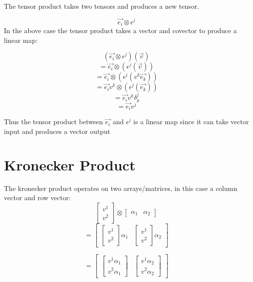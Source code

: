 \documentclass{report}
\begin{document}
The tensor product takes two tensors and produces a new tensor.

$$ \vec{e_i} \otimes \epsilon^j $$ 
In the above case the tensor product takes a vector and covector to produce a linear map:

\begin{myproof}
$$\left(  \vec{e_i} \otimes \epsilon^j  \right) \left( \vec{v} \right)$$ 
$$=  \vec{e_i} \otimes \left( \epsilon^j  \left( \vec{v} \right) \right)$$ 
$$=  \vec{e_i} \otimes \left( \epsilon^j  \left( v^k \vec{e_k} \right) \right)$$ 
$$=  \vec{e_i} v^k \otimes \left(  \epsilon^j   \left(  \vec{e_k} \right) \right)$$ 
$$=  \vec{e_i} v^k \delta_k^j $$ 
$$=  \vec{e_i} v^j $$ 

Thus the tensor product between $\vec{e_i}$ and $\epsilon^j$ is a linear map since it can take vector input and produces a vector output
	
\end{myproof}

\section{Kronecker Product}
The kronecker product operates on two arrays/matrices, in this case a column vector and row vector:
$$ \begin{bmatrix} v^1 \\ v^2 \end{bmatrix} \otimes \begin{bmatrix} \alpha_1 & \alpha_2 \end{bmatrix}  $$ 
$$ = \begin{bmatrix} \begin{bmatrix} v^1  \\ v^2 \end{bmatrix}\alpha_1 & \begin{bmatrix} v^1  \\ v^2 \end{bmatrix} \alpha_2  \end{bmatrix}  $$ 

$$ = \begin{bmatrix} \begin{bmatrix} v^1 \alpha_1 \\ v^2 \alpha_1 \end{bmatrix} & \begin{bmatrix} v^1 \alpha_2 \\ v^2 \alpha_2 \end{bmatrix}   \end{bmatrix}  $$ 
\end{document}
